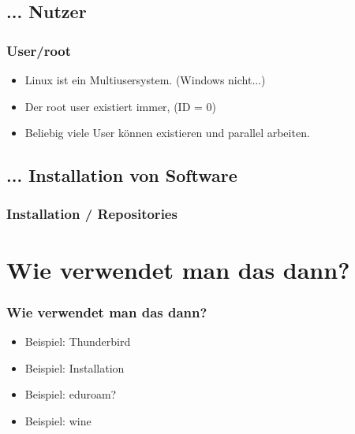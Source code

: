 \documentclass{beamer}
\begin{document}
        \subsection{... Nutzer}
            \begin{frame}
          		\frametitle{User/root}
        		\begin{minipage}{0.9\textwidth}
        		    \begin{itemize}
        		        \item Linux ist ein Multiusersystem. (Windows nicht...)
        		        \item Der root user existiert immer, (ID = 0)
        		        \item Beliebig viele User können existieren und parallel arbeiten.
        		    \end{itemize}
        		\end{minipage} 
        		
        		\begin{minipage}{0.54\textwidth}
        		
        		\end{minipage}
        	\end{frame}
        	
        \subsection{... Installation von Software}
            \begin{frame}
          		\frametitle{Installation / Repositories}
        		\begin{minipage}{0.44\textwidth}
        		
        		\end{minipage}%
        		\begin{minipage}{0.54\textwidth}
        		
        		\end{minipage}
        	\end{frame}

    \section{Wie verwendet man das dann?}
        \begin{frame}
  		\frametitle{Wie verwendet man das dann?}
    		\begin{center}
        		\begin{minipage}{0.44\textwidth}
        		    \begin{itemize}
        		        \item Beispiel: Thunderbird
        		        \item Beispiel: Installation
        		        \item Beispiel: eduroam?
        		        \item Beispiel: wine
        		    \end{itemize}
        		\end{minipage}%
    		\end{center}
    	\end{frame}
    	
\end{document}

